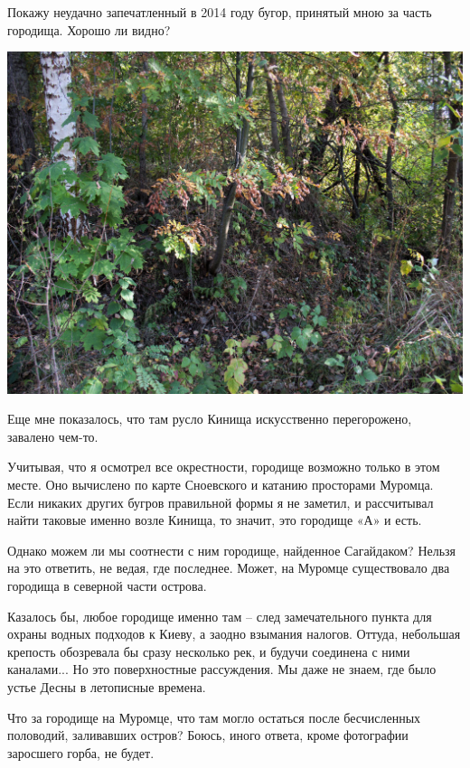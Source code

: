 Покажу неудачно запечатленный в 2014 году бугор, принятый мною за часть городища. Хорошо ли видно?

\begin{center}
\includegraphics[width=\linewidth]{chast-gorodki/cherto/mur-CRW_4031.jpg}
\end{center}

Еще мне показалось, что там русло Кинища искусственно перегорожено, завалено чем-то.

Учитывая, что я осмотрел все окрестности, городище возможно только в этом месте. Оно вычислено по карте Сноевского и катанию просторами Муромца. Если никаких других бугров правильной формы я не заметил, и рассчитывал найти таковые именно возле Кинища, то значит, это городище «А» и есть.

Однако можем ли мы соотнести с ним городище, найденное Сагайдаком? Нельзя на это ответить, не ведая, где последнее. Может, на Муромце существовало два городища в северной части острова.

Казалось бы, любое городище именно там – след замечательного пункта для охраны водных подходов к Киеву, а заодно взымания налогов. Оттуда, небольшая крепость обозревала бы сразу несколько рек, и будучи соединена с ними каналами... Но это поверхностные рассуждения.
Мы даже не знаем, где было устье Десны в летописные времена.

Что за городище на Муромце, что там могло остаться после бесчисленных половодий, заливавших остров? Боюсь, иного ответа, кроме фотографии заросшего горба, не будет.


